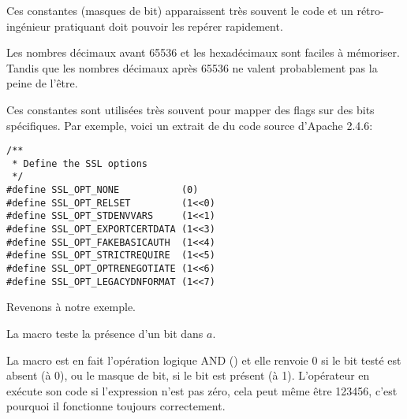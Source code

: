 Ces constantes (masques de bit) apparaissent très souvent le code et un rétro-ingénieur
pratiquant doit pouvoir les repérer rapidement.

Les nombres décimaux avant 65536 et les hexadécimaux sont faciles à mémoriser.
Tandis que les nombres décimaux après 65536 ne valent probablement pas la peine de
l'être.

Ces constantes sont utilisées très souvent pour mapper des flags sur des bits spécifiques.
Par exemple, voici un extrait de  du code source d'Apache 2.4.6:

\begin{lstlisting}[style=customc]
/**
 * Define the SSL options
 */
#define SSL_OPT_NONE           (0)
#define SSL_OPT_RELSET         (1<<0)
#define SSL_OPT_STDENVVARS     (1<<1)
#define SSL_OPT_EXPORTCERTDATA (1<<3)
#define SSL_OPT_FAKEBASICAUTH  (1<<4)
#define SSL_OPT_STRICTREQUIRE  (1<<5)
#define SSL_OPT_OPTRENEGOTIATE (1<<6)
#define SSL_OPT_LEGACYDNFORMAT (1<<7)
\end{lstlisting}

Revenons à notre exemple.

La macro  teste la présence d'un bit dans $a$.

La macro  est en fait l'opération logique AND () et elle renvoie
0 si le bit testé est absent (à 0), ou le masque de bit, si le bit est présent (à 1).
L'opérateur  en \CCpp exécute son code si l'expression n'est pas zéro,
cela peut même être 123456, c'est pourquoi il fonctionne toujours correctement.





